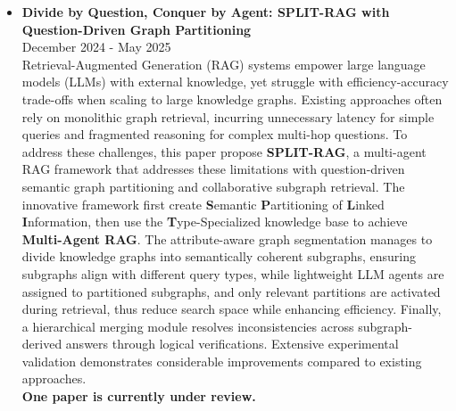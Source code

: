 \documentclass[10pt,article]{article}
\begin{document}
\begin{itemize}
    \item \textbf{Divide by Question, Conquer by Agent: SPLIT-RAG with Question-Driven Graph Partitioning} \\ \hfill December 2024 - May 2025 \\
    Retrieval-Augmented Generation (RAG) systems empower large language models (LLMs) with external knowledge, yet struggle with efficiency-accuracy trade-offs when scaling to large knowledge graphs. Existing approaches often rely on monolithic graph retrieval, incurring unnecessary latency for simple queries and fragmented reasoning for complex multi-hop questions. To address these challenges, this paper propose \textbf{SPLIT-RAG}, a multi-agent RAG framework that addresses these limitations with question-driven semantic graph partitioning and collaborative subgraph retrieval. The innovative framework first create \textbf{S}emantic \textbf{P}artitioning of \textbf{L}inked \textbf{I}nformation, then use the \textbf{T}ype-Specialized knowledge base to achieve \textbf{Multi-Agent RAG}. The attribute-aware graph segmentation manages to divide knowledge graphs into semantically coherent subgraphs, ensuring subgraphs align with different query types, while lightweight LLM agents are assigned to partitioned subgraphs, and only relevant partitions are activated during retrieval, thus reduce search space while enhancing efficiency. Finally, a hierarchical merging module resolves inconsistencies across subgraph-derived answers through logical verifications. Extensive experimental validation demonstrates considerable improvements compared to existing approaches. \\
    \textbf{One paper is currently under review.}


\end{itemize}
\end{document}
